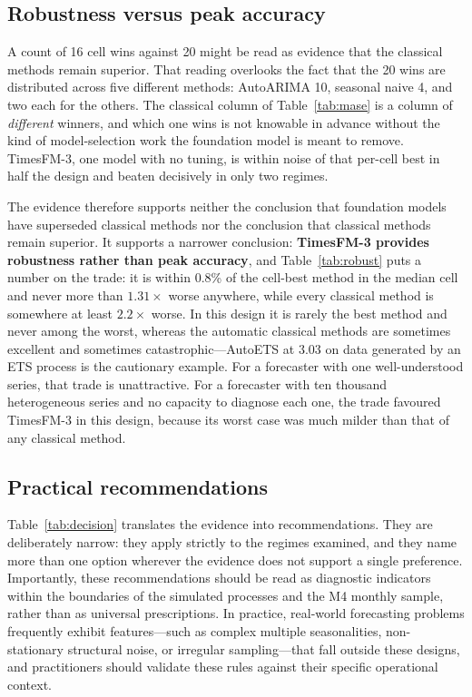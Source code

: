 \documentclass[11pt]{article}
\providecommand{\tableref}[1]{Table~\ref{#1}}
\begin{document}
\subsection{Robustness versus peak accuracy}
\label{sec:tradeoff}

A count of 16 cell wins against 20 might be read as evidence that the classical methods remain
superior. That reading overlooks the fact that the 20 wins are distributed across five different
methods: AutoARIMA 10, seasonal naive 4, and two each for the others. The classical column of
\tableref{tab:mase} is a column of \emph{different} winners, and which one wins is not knowable
in advance without the kind of model-selection work the foundation model is meant to remove.
TimesFM-3, one model with no tuning, is within noise of that per-cell best in half the design
and beaten decisively in only two regimes.

The evidence therefore supports neither the conclusion that foundation models have superseded
classical methods nor the conclusion that classical methods remain superior. It supports a
narrower conclusion: \textbf{TimesFM-3 provides robustness rather than peak accuracy}, and
\tableref{tab:robust} puts a number on the trade: it is within 0.8\% of the cell-best method in
the median cell and never more than $1.31\times$ worse anywhere, while every classical method is
somewhere at least $2.2\times$ worse. In this design it is rarely the best method and never among
the worst, whereas
the automatic classical methods are sometimes excellent and sometimes catastrophic---AutoETS at
3.03 on data generated by an ETS process is the cautionary example. For a forecaster with one
well-understood series, that trade is unattractive. For a forecaster with ten thousand
heterogeneous series and no capacity to diagnose each one, the trade favoured TimesFM-3 in this
design, because its worst case was much milder than that of any classical method.

\subsection{Practical recommendations}
\label{sec:recommendations}

\tableref{tab:decision} translates the evidence into recommendations. They are deliberately
narrow: they apply strictly to the regimes examined, and they name more than one option wherever the
evidence does not support a single preference. Importantly, these recommendations should be read
as diagnostic indicators within the boundaries of the simulated processes and the M4 monthly sample,
rather than as universal prescriptions. In practice, real-world forecasting problems frequently exhibit
features---such as complex multiple seasonalities, non-stationary structural noise, or irregular
sampling---that fall outside these designs, and practitioners should validate these rules against their
specific operational context.
\end{document}
